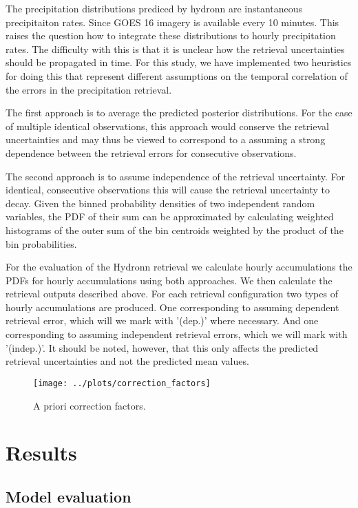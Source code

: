 \documentclass[journal abbreviation, manuscript]{copernicus}
\begin{document}
{The precipitation distributions prediced by hydronn are instantaneous
precipitaiton rates. Since GOES 16 imagery is available every 10 minutes. This
raises the question how to integrate these distributions to hourly precipitation
rates. The difficulty with this is that it is unclear how the retrieval
uncertainties should be propagated in time. For this study, we have implemented
two heuristics for doing this that represent different assumptions on the
temporal correlation of the errors in the precipitation retrieval.

The first approach is to average the predicted posterior distributions. For the
case of multiple identical observations, this approach would conserve the
retrieval uncertainties and may thus be viewed to correspond to a assuming a
strong dependence between the retrieval errors for consecutive observations.

The second approach is to assume independence of the retrieval uncertainty. For
identical, consecutive observations this will cause the retrieval uncertainty to
decay. Given the binned probability densities of two independent random
variables, the PDF of their sum can be approximated by calculating weighted
histograms of the outer sum of the bin centroids weighted by the product of the
bin probabilities.

For the evaluation of the Hydronn retrieval we calculate hourly accumulations
the PDFs for hourly accumulations using both approaches. We then calculate the
retrieval outputs described above. For each retrieval configuration two types of
hourly accumulations are produced. One corresponding to assuming dependent
retrieval error, which will we mark with '(dep.)' where necessary. And one
corresponding to assuming independent retrieval errors, which we will mark with
'(indep.)'. It should be noted, however, that this only affects the predicted
retrieval uncertainties and not the predicted mean values.


\begin{figure}
  \centering
  \texttt{[image: ../plots/correction\_factors]}
  \caption{
    A priori correction factors.
    }
  \label{fig:correction_factors}
\end{figure}

\section{Results}

\subsection{Model evaluation}

}
\end{document}
